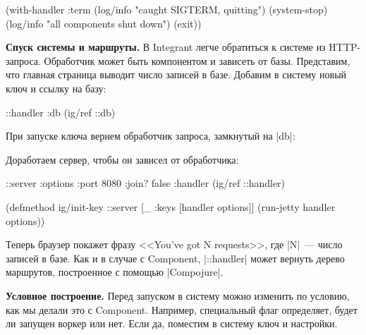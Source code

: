 \begin{english}
  \begin{clojure}
(with-handler :term
  (log/info "caught SIGTERM, quitting")
  (system-stop)
  (log/info "all components shut down")
  (exit))
  \end{clojure}
\end{english}

\textbf{Спуск системы и маршруты.} В Integrant легче обратиться к
системе из HTTP-запроса. Обработчик может быть компонентом и зависеть от базы.
Представим, что главная страница выводит число записей в базе. Добавим в систему
новый ключ и ссылку на базу:

\begin{english}
  \begin{clojure}
{::handler {:db (ig/ref ::db)}}
  \end{clojure}
\end{english}

При запуске ключа вернем обработчик запроса, замкнутый на \spverb|db|:

\begin{english}
\end{english}

Доработаем сервер, чтобы он зависел от обработчика:

\begin{english}
  \begin{clojure}
{::server {:options {:port 8080 :join? false}
           :handler (ig/ref ::handler)}}

(defmethod ig/init-key ::server
  [_ {:keys [handler options]}]
  (run-jetty handler options))
  \end{clojure}
\end{english}

Теперь браузер покажет фразу <<You've got N requests>>, где \spverb|N|~--- число
записей в базе. Как и в случае с Component, \spverb|::handler| может
вернуть дерево маршрутов, построенное с помощью \spverb|Compojure|.

\textbf{Условное построение.} Перед запуском в систему можно изменить по
условию, как мы делали это с Component. Например, специальный флаг
определяет, будет ли запущен воркер или нет. Если да, поместим в систему ключ и
настройки.

